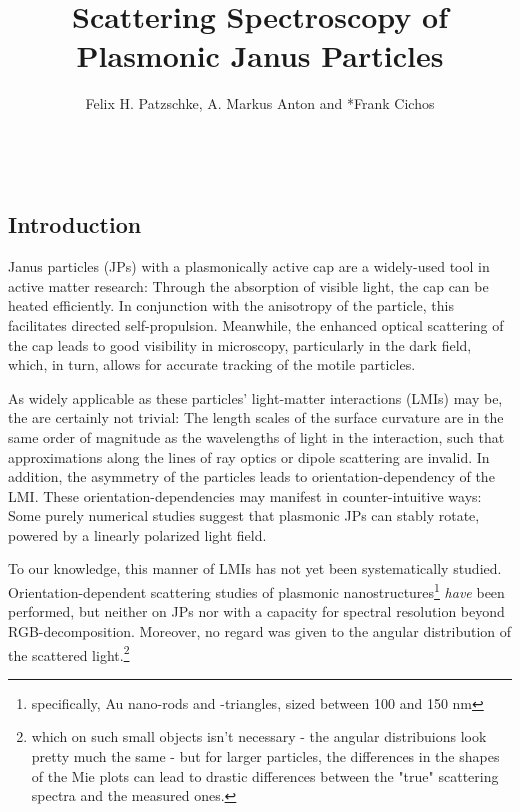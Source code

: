 \documentclass[10pt]{article}
\title{\sffamily\bfseries\color{Maroon} Scattering Spectroscopy of\\Plasmonic Janus Particles}
\author{Felix H. Patzschke, A. Markus Anton and *Frank Cichos}
\date{}
\begin{document}

\maketitle

\begin{abstract}\sffamily \vspace{-1em}  \\ \end{abstract}





\begin{multicols}{2}

\section*{Introduction}


Janus particles (JPs) with a plasmonically active cap are a widely-used tool in active matter research: 
Through the absorption of visible light, the cap can be heated efficiently. 
In conjunction with the anisotropy of the particle, this facilitates directed self-propulsion. 
Meanwhile, the enhanced optical scattering of the cap leads to good visibility in microscopy, particularly in the dark field, which, in turn, allows for accurate tracking of the motile particles. 

As widely applicable as these particles' light-matter interactions (LMIs) may be, the are certainly not trivial: 
The length scales of the surface curvature are in the same order of magnitude as the wavelengths of light in the interaction, such that approximations along the lines of ray optics or dipole scattering are invalid. 
In addition, the asymmetry of the particles leads to orientation-dependency of the LMI. 
These orientation-dependencies may manifest in counter-intuitive ways: 
Some purely numerical studies suggest that plasmonic JPs can stably rotate, powered by a linearly polarized light field. \cite{Ilic2017,BA}

To our knowledge, this manner of LMIs has not yet been systematically studied. 
Orientation-dependent scattering studies of plasmonic nanostructures\footnote{specifically, Au nano-rods and -triangles, sized between 100 and 150 nm} \emph{have} been performed, \cite{Islam2021} but neither on JPs nor with a capacity for spectral resolution beyond RGB-decomposition. 
Moreover, no regard was given to the angular distribution of the scattered light.\footnote{which on such small objects isn't necessary - the angular distribuions look pretty much the same - but for larger particles, the differences in the shapes of the Mie plots can lead to drastic differences between the "true" scattering spectra and the measured ones.} 


\end{multicols}
\end{document}
